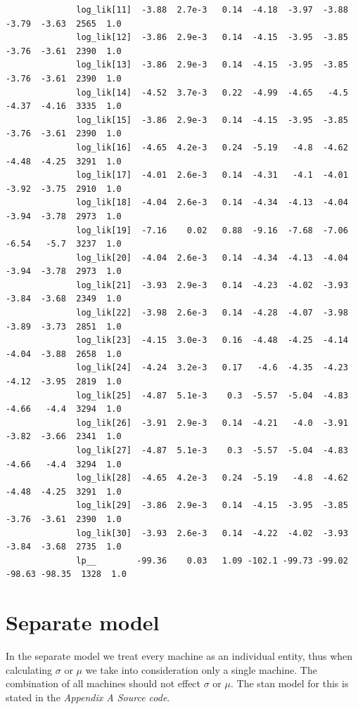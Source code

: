 \documentclass[11pt,a4paper,english]{article}
\begin{document}
\begin{itemize}
\begin{verbatim}
              log_lik[11]  -3.88  2.7e-3   0.14  -4.18  -3.97  -3.88  -3.79  -3.63  2565  1.0
              log_lik[12]  -3.86  2.9e-3   0.14  -4.15  -3.95  -3.85  -3.76  -3.61  2390  1.0
              log_lik[13]  -3.86  2.9e-3   0.14  -4.15  -3.95  -3.85  -3.76  -3.61  2390  1.0
              log_lik[14]  -4.52  3.7e-3   0.22  -4.99  -4.65   -4.5  -4.37  -4.16  3335  1.0
              log_lik[15]  -3.86  2.9e-3   0.14  -4.15  -3.95  -3.85  -3.76  -3.61  2390  1.0
              log_lik[16]  -4.65  4.2e-3   0.24  -5.19   -4.8  -4.62  -4.48  -4.25  3291  1.0
              log_lik[17]  -4.01  2.6e-3   0.14  -4.31   -4.1  -4.01  -3.92  -3.75  2910  1.0
              log_lik[18]  -4.04  2.6e-3   0.14  -4.34  -4.13  -4.04  -3.94  -3.78  2973  1.0
              log_lik[19]  -7.16    0.02   0.88  -9.16  -7.68  -7.06  -6.54   -5.7  3237  1.0
              log_lik[20]  -4.04  2.6e-3   0.14  -4.34  -4.13  -4.04  -3.94  -3.78  2973  1.0
              log_lik[21]  -3.93  2.9e-3   0.14  -4.23  -4.02  -3.93  -3.84  -3.68  2349  1.0
              log_lik[22]  -3.98  2.6e-3   0.14  -4.28  -4.07  -3.98  -3.89  -3.73  2851  1.0
              log_lik[23]  -4.15  3.0e-3   0.16  -4.48  -4.25  -4.14  -4.04  -3.88  2658  1.0
              log_lik[24]  -4.24  3.2e-3   0.17   -4.6  -4.35  -4.23  -4.12  -3.95  2819  1.0
              log_lik[25]  -4.87  5.1e-3    0.3  -5.57  -5.04  -4.83  -4.66   -4.4  3294  1.0
              log_lik[26]  -3.91  2.9e-3   0.14  -4.21   -4.0  -3.91  -3.82  -3.66  2341  1.0
              log_lik[27]  -4.87  5.1e-3    0.3  -5.57  -5.04  -4.83  -4.66   -4.4  3294  1.0
              log_lik[28]  -4.65  4.2e-3   0.24  -5.19   -4.8  -4.62  -4.48  -4.25  3291  1.0
              log_lik[29]  -3.86  2.9e-3   0.14  -4.15  -3.95  -3.85  -3.76  -3.61  2390  1.0
              log_lik[30]  -3.93  2.6e-3   0.14  -4.22  -4.02  -3.93  -3.84  -3.68  2735  1.0
              lp__        -99.36    0.03   1.09 -102.1 -99.73 -99.02 -98.63 -98.35  1328  1.0
            \end{verbatim}
        \end{itemize}

      \section{Separate model}
        In the separate model we treat every machine as an individual entity, thus when calculating $\sigma$ or $\mu$ we take into consideration only a single machine. The combination of all machines should not effect $\sigma$ or $\mu$. The stan model for this is stated in the \textit{Appendix A Source code}.
\end{document}
